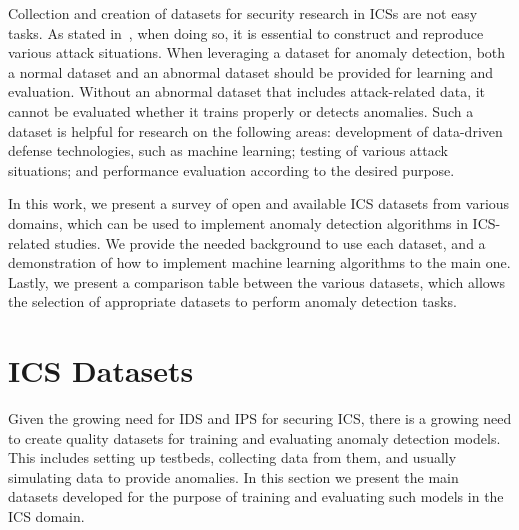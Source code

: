 \documentclass[english,12pt]{article}
\begin{document}

Collection and creation of datasets for security research in ICSs are not easy tasks.
As stated in~\cite{DBLP:conf/uss/ChoiYM21}, when doing so, it is essential
to construct and reproduce various attack situations. When leveraging a dataset
for anomaly detection, both a normal dataset and an abnormal dataset should be
provided for learning and evaluation. Without an abnormal dataset that includes
attack-related data, it cannot be evaluated whether it trains properly or detects
anomalies. Such a dataset is helpful for research on the following areas:
development of data-driven defense technologies, such as machine learning;
testing of various attack situations; and performance evaluation according to the
desired purpose.

In this work, we present a survey of open and available ICS datasets from various
domains, which can be used to implement anomaly detection algorithms in
ICS-related studies. We provide the needed background to use each dataset, and a
demonstration of how to implement machine learning algorithms to the main one.
Lastly, we present a comparison table between the various datasets, which allows
the selection of appropriate datasets to perform anomaly detection tasks.

\pagebreak{}

\section{ICS Datasets} \label{datasets}
Given the growing need for IDS and IPS for securing ICS, there is a growing need to create
quality datasets for training and evaluating anomaly detection models. This includes setting up
testbeds, collecting data from them, and usually simulating data to provide anomalies. In this section
we present the main datasets developed for the purpose of training and evaluating such models in the
ICS domain.
\end{document}
